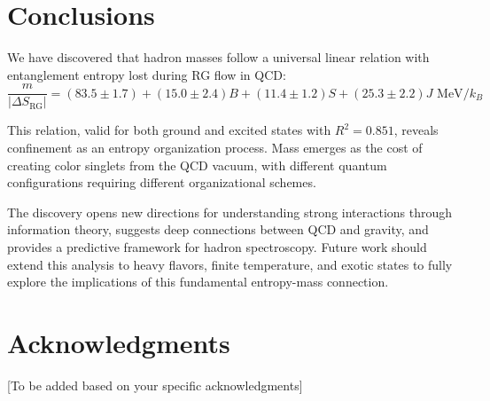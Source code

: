 \documentclass[12pt,a4paper]{article}
\begin{document}
\section{Conclusions}

We have discovered that hadron masses follow a universal linear relation with entanglement entropy lost during RG flow in QCD:
\begin{equation}
\boxed{\frac{m}{|\Delta S_{\text{RG}}|} = (83.5 \pm 1.7) + (15.0 \pm 2.4)B + (11.4 \pm 1.2)S + (25.3 \pm 2.2)J \text{ MeV}/k_B}
\end{equation}

This relation, valid for both ground and excited states with $R^2 = 0.851$, reveals confinement as an entropy organization process. Mass emerges as the cost of creating color singlets from the QCD vacuum, with different quantum configurations requiring different organizational schemes.

The discovery opens new directions for understanding strong interactions through information theory, suggests deep connections between QCD and gravity, and provides a predictive framework for hadron spectroscopy. Future work should extend this analysis to heavy flavors, finite temperature, and exotic states to fully explore the implications of this fundamental entropy-mass connection.

\section*{Acknowledgments}

[To be added based on your specific acknowledgments]
\end{document}
